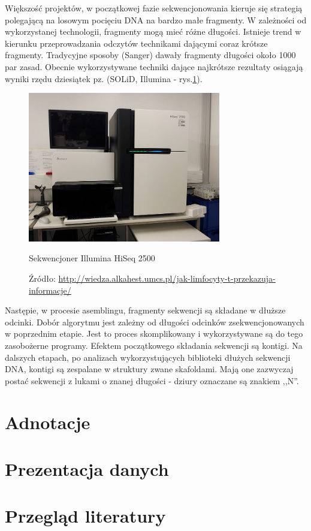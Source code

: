 Większość projektów, w początkowej fazie sekwencjonowania kieruje się strategią polegającą na losowym pocięciu DNA na bardzo małe fragmenty.
W zależności od wykorzystanej technologii, fragmenty mogą mieć różne długości. Istnieje trend w kierunku przeprowadzania odczytów technikami dającymi coraz krótsze fragmenty. 
Tradycyjne sposoby (Sanger) dawały fragmenty długości około 1000 par zasad. Obecnie wykorzystywane techniki dające najkrótsze rezultaty osiągają wyniki rzędu dziesiątek pz. (SOLiD, Illumina - rys.\ref{img:sekwencjoner-illumina}).

\begin{figure}[h]
	\centering
	\includegraphics[width=0.75\textwidth]{img/sekwencjoner-illumina.jpg}
	\caption{Sekwencjoner Illumina HiSeq 2500}
	\vspace{-0.5cm}
	\caption*{\scriptsize Źródło: \url{http://wiedza.alkahest.umcs.pl/jak-limfocyty-t-przekazuja-informacje/}}
	\label{img:sekwencjoner-illumina}
\end{figure}

Następie, w procesie asemblingu, fragmenty sekwencji są składane w dłuższe odcinki. Dobór algorytmu jest zależny od długości odcinków zsekwencjonowanych w poprzednim etapie. Jest to proces skomplikowany i wykorzystywane są do tego zasobożerne programy. 
Efektem początkowego składania sekwencji są kontigi.
Na dalszych etapach, po analizach wykorzystujących biblioteki dłużych sekwencji DNA, kontigi są zespalane w struktury zwane skafoldami.
Mają one zazwyczaj postać sekwencji z lukami o znanej długości - dziury oznaczane są znakiem ,,N''.

\section{Adnotacje}

\section{Prezentacja danych}

\section{Przegląd literatury}